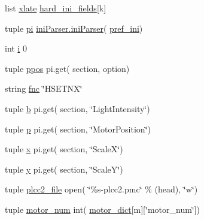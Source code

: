 \begin{DoxyCompactItemize}
\item 
list \hyperlink{namespacemk__pgpmac__redis_afba647feb8fc4d0a364c3dca29af3a22}{xlate} \hyperlink{namespacemk__pgpmac__redis_a8257226983aee079ec66f5cc67e194ec}{hard\-\_\-ini\-\_\-fields}\mbox{[}k\mbox{]}
\item 
tuple \hyperlink{namespacemk__pgpmac__redis_a2f5bbda0250eecd94d166dc0a2fbff86}{pi} \hyperlink{classiniParser_1_1iniParser}{ini\-Parser.\-ini\-Parser}( \hyperlink{namespacemk__pgpmac__redis_a38c785af5201403976e1267c47ea5096}{pref\-\_\-ini})
\item 
int \hyperlink{namespacemk__pgpmac__redis_afa643a23a5984fe44c2182ada3dfa401}{i} 0
\item 
tuple \hyperlink{namespacemk__pgpmac__redis_ad9356b4b4c48789f17e6e8fd682e2798}{ppos} pi.\-get( section, option)
\item 
string \hyperlink{namespacemk__pgpmac__redis_a654b54ba0758b8b84516938260851129}{fnc} \char`\"{}H\-S\-E\-T\-N\-X\char`\"{}
\item 
tuple \hyperlink{namespacemk__pgpmac__redis_a90faa2042277e396b48b19374c9db4ab}{b} pi.\-get( section, \char`\"{}Light\-Intensity\char`\"{})
\item 
tuple \hyperlink{namespacemk__pgpmac__redis_a11daf2847f2dc94562b5b61b3f412574}{p} pi.\-get( section, \char`\"{}Motor\-Position\char`\"{})
\item 
tuple \hyperlink{namespacemk__pgpmac__redis_abc8696f6f2f3fd3edd30989d3c8ec301}{x} pi.\-get( section, \char`\"{}Scale\-X\char`\"{})
\item 
tuple \hyperlink{namespacemk__pgpmac__redis_a34220d58136fb95853f54ed51a130f79}{y} pi.\-get( section, \char`\"{}Scale\-Y\char`\"{})
\item 
tuple \hyperlink{namespacemk__pgpmac__redis_a950307aae727f0afc8120ab03445b411}{plcc2\-\_\-file} open( \char`\"{}\%s-\/plcc2.\-pmc\char`\"{} \% (head), \char`\"{}w\char`\"{})
\item 
tuple \hyperlink{namespacemk__pgpmac__redis_a292515b2acabb0dcade5b16584cdb011}{motor\-\_\-num} int( \hyperlink{namespacemk__pgpmac__redis_ad8583d4fe88c4c98af73d2858c51c660}{motor\-\_\-dict}\mbox{[}m\mbox{]}\mbox{[}\char`\"{}motor\-\_\-num\char`\"{}\mbox{]})
\end{DoxyCompactItemize}



